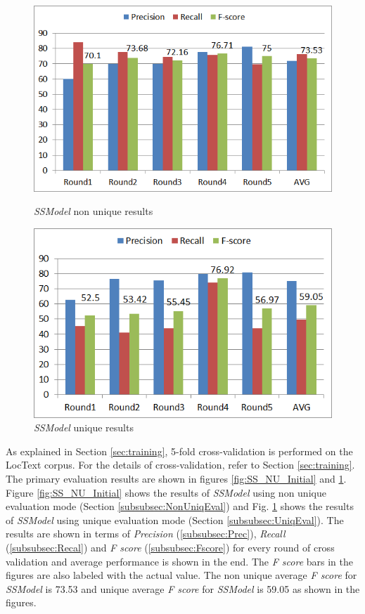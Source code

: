 \begin{figure}
\centering
\begin{minipage}{.5\textwidth}
  \centering
  \includegraphics[width=.95\textwidth]{figures/SSInitialResultsNUniq.png}
  \caption{\textit{SSModel} non unique results}
  \label{fig:SS_NU_Initial}
\end{minipage}%
\begin{minipage}{.5\textwidth}
  \centering
  \includegraphics[width=.95\textwidth]{figures/SSInitialResultsUniq.png}
  \caption{\textit{SSModel} unique results}
  \label{fig:SS_U_Initial}
\end{minipage}
\end{figure}

As explained in Section \ref{sec:training}, 5-fold cross-validation is performed on the LocText corpus. For the details of cross-validation, refer to Section \ref{sec:training}. The primary evaluation results are shown in figures \ref{fig:SS_NU_Initial} and \ref{fig:SS_U_Initial}. Figure \ref{fig:SS_NU_Initial} shows the results of \textit{SSModel} using non unique evaluation mode (Section \ref{subsubsec:NonUniqEval}) and Fig. \ref{fig:SS_U_Initial} shows the results of \textit{SSModel} using unique evaluation mode (Section \ref{subsubsec:UniqEval}). The results are shown in terms of \textit{Precision} (\ref{subsubsec:Prec}), \textit{Recall} (\ref{subsubsec:Recal}) and \textit{F score} (\ref{subsubsec:Fscore}) for every round of cross validation and average performance is shown in the end. The \textit{F score} bars in the figures are also labeled with the actual value. The non unique average \textit{F score} for \textit{SSModel} is 73.53 and unique average \textit{F score} for \textit{SSModel} is 59.05 as shown in the figures.


